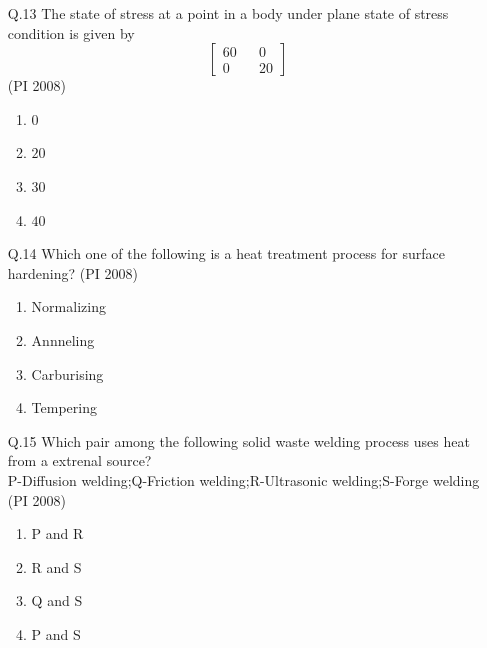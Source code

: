 \documentclass[journal,12pt,onecolumn]{IEEEtran}
\theoremstyle{remark}
\begin{document}
\begin{enumerate}
\begin{multicols}{4}
\begin{enumerate}[label=(\Alph*)]
        \item $d>\mu L$
        \item $\mu>Ld$
    \end{enumerate}
\end{multicols}
\vspace{1cm}
\item[\textnormal{Q.13}]  The state of stress at a point in a body under plane state of stress condition is given by\[ \begin{bmatrix}
60 && 0 \\
0 && 20
\end{bmatrix}\]
    \hfill{(PI 2008)}
    \begin{multicols}{4}
    \begin{enumerate}[label=(\Alph*)]
        \item $0$
        \item $20$
        \item $30$
        \item $40$
    \end{enumerate}
\end{multicols}
\vspace{1cm}
\item[\textnormal{Q.14}]  Which one of the following is a heat treatment process for surface hardening?
    \hfill{(PI 2008)}
    \begin{multicols}{4}
    \begin{enumerate}[label=(\Alph*)]
        \item Normalizing
        \item Annneling
        \item Carburising
        \item Tempering
    \end{enumerate}
\end{multicols}
\vspace{1cm}
\item[\textnormal{Q.15}]  Which pair among the following solid waste welding process uses heat from a extrenal source?\\
P-Diffusion welding;Q-Friction welding;R-Ultrasonic welding;S-Forge welding
    \hfill{(PI 2008)}
    \begin{multicols}{4}
    \begin{enumerate}[label=(\Alph*)]
        \item P and R
        \item R and S
        \item Q and S
        \item P and S

\end{enumerate}
\end{multicols}
\end{enumerate}
\end{document}
